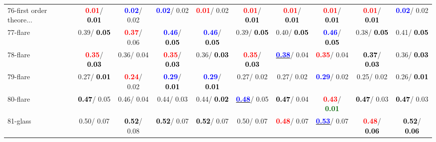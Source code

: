 \begin{table}[h]
\begin{center}
{\begin{tabular}{lc|c|c|c|c|c|c|c|c}
76-first order theore... & \textcolor{red}{\textbf{  0.01}}/\textcolor{black}{\textbf{  0.01}} & \textcolor{blue}{\textbf{  0.02}}/  0.02 & \textcolor{blue}{\textbf{  0.02}}/  0.02 & \textcolor{red}{\textbf{  0.01}}/  0.02 & \textcolor{red}{\textbf{  0.01}}/\textcolor{black}{\textbf{  0.01}} & \textcolor{red}{\textbf{  0.01}}/\textcolor{black}{\textbf{  0.01}} & \textcolor{red}{\textbf{  0.01}}/\textcolor{black}{\textbf{  0.01}} & \textcolor{red}{\textbf{  0.01}}/\textcolor{black}{\textbf{  0.01}} & \textcolor{blue}{\textbf{  0.02}}/  0.02 \\
77-flare &   0.39/\textcolor{black}{\textbf{  0.05}} & \textcolor{red}{\textbf{  0.37}}/  0.06 & \textcolor{blue}{\textbf{  0.46}}/\textcolor{black}{\textbf{  0.05}} & \textcolor{blue}{\textbf{  0.46}}/\textcolor{black}{\textbf{  0.05}} &   0.39/\textcolor{black}{\textbf{  0.05}} &   0.40/\textcolor{black}{\textbf{  0.05}} & \textcolor{blue}{\textbf{  0.46}}/\textcolor{black}{\textbf{  0.05}} &   0.38/\textcolor{black}{\textbf{  0.05}} &   0.41/\textcolor{black}{\textbf{  0.05}} \\
78-flare & \textcolor{red}{\textbf{  0.35}}/\textcolor{black}{\textbf{  0.03}} &   0.36/  0.04 & \textcolor{red}{\textbf{  0.35}}/\textcolor{black}{\textbf{  0.03}} &   0.36/\textcolor{black}{\textbf{  0.03}} & \textcolor{red}{\textbf{  0.35}}/\textcolor{black}{\textbf{  0.03}} & \underline{\textcolor{blue}{\textbf{  0.38}}}/  0.04 & \textcolor{red}{\textbf{  0.35}}/  0.04 & \textcolor{black}{\textbf{  0.37}}/\textcolor{black}{\textbf{  0.03}} &   0.36/\textcolor{black}{\textbf{  0.03}} \\ \hline
79-flare &   0.27/\textcolor{black}{\textbf{  0.01}} & \textcolor{red}{\textbf{  0.24}}/  0.02 & \textcolor{blue}{\textbf{  0.29}}/\textcolor{black}{\textbf{  0.01}} & \textcolor{blue}{\textbf{  0.29}}/\textcolor{black}{\textbf{  0.01}} &   0.27/  0.02 &   0.27/  0.02 & \textcolor{blue}{\textbf{  0.29}}/  0.02 &   0.25/  0.02 &   0.26/\textcolor{black}{\textbf{  0.01}} \\
80-flare & \textcolor{black}{\textbf{  0.47}}/  0.05 &   0.46/  0.04 &   0.44/  0.03 &   0.44/\textcolor{black}{\textbf{  0.02}} & \underline{\textcolor{blue}{\textbf{  0.48}}}/  0.05 & \textcolor{black}{\textbf{  0.47}}/  0.04 & \textcolor{red}{\textbf{  0.43}}/\textcolor{darkgreen}{\textbf{  0.01}} & \textcolor{black}{\textbf{  0.47}}/  0.03 & \textcolor{black}{\textbf{  0.47}}/  0.03 \\
81-glass &   0.50/  0.07 & \textcolor{black}{\textbf{  0.52}}/  0.08 & \textcolor{black}{\textbf{  0.52}}/  0.07 & \textcolor{black}{\textbf{  0.52}}/  0.07 &   0.50/  0.07 & \textcolor{red}{\textbf{  0.48}}/  0.07 & \underline{\textcolor{blue}{\textbf{  0.53}}}/  0.07 & \textcolor{red}{\textbf{  0.48}}/\textcolor{black}{\textbf{  0.06}} & \textcolor{black}{\textbf{  0.52}}/\textcolor{black}{\textbf{  0.06}} \\

\end{tabular}}
\end{center}
\end{table}
